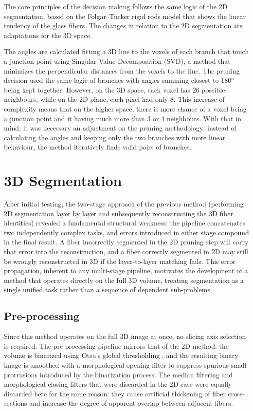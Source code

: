 The core principles of the decision making follows the same logic of the 2D segmentation, based on the Folgar–Tucker rigid rods model that shows the linear tendency of the glass fibers. The changes in relation to the 2D segmentation are adaptations for the 3D space.

The angles are calculated fitting a 3D line to the voxels of each branch that touch a junction point using Singular Value Decomposition (SVD), a method that minimizes the perpendicular distances from the voxels to the line. The pruning decision used the same logic of branches with angles summing closest to 180° being kept together. However, on the 3D space, each voxel has 26 possible neighbours, while on the 2D plane, each pixel had only 8. This increase of complexity means that on the higher space, there is more chance of a voxel being a junction point and it having much more than 3 or 4 neighbours. With that in mind, it was necessary an adjustment on the pruning methodology: instead of calculating the angles and keeping only the two branches with more linear behaviour, the method iteratively finds valid pairs of branches.

\section{3D Segmentation}
\label{method2}

After initial testing, the two-stage approach of the previous method (performing 2D segmentation layer by layer and subsequently reconstructing the 3D fiber identities) revealed a fundamental structural weakness: the pipeline concatenates two independently complex tasks, and errors introduced in either stage compound in the final result. A fiber incorrectly segmented in the 2D pruning step will carry that error into the reconstruction, and a fiber correctly segmented in 2D may still be wrongly reconstructed in 3D if the layer-to-layer matching fails. This error propagation, inherent to any multi-stage pipeline, motivates the development of a method that operates directly on the full 3D volume, treating segmentation as a single unified task rather than a sequence of dependent sub-problems.

\subsection{Pre-processing}

Since this method operates on the full 3D image at once, no slicing axis selection is required. The pre-processing pipeline mirrors that of the 2D method: the volume is binarized using Otsu's global thresholding \cite{otsu}, and the resulting binary image is smoothed with a morphological opening filter to suppress spurious small protrusions introduced by the binarization process. The median filtering and morphological closing filters that were discarded in the 2D case were equally discarded here for the same reason: they cause artificial thickening of fiber cross-sections and increase the degree of apparent overlap between adjacent fibers.

